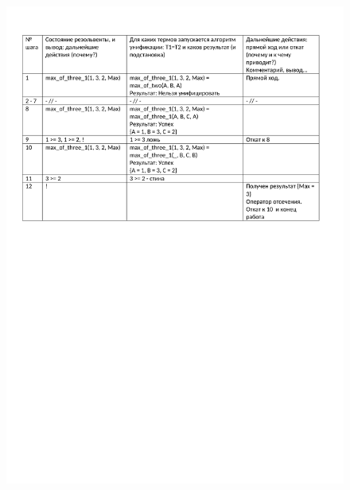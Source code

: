 \begin{figure}[H]
	\begin{center}
		\includegraphics[scale=0.85]{img/15.2.pdf}
	\end{center}
	
\end{figure}